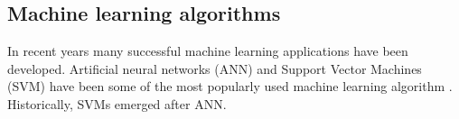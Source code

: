 %
%
%
%
%
%
%
%
%
%
%
%
%
%



\subsection{Machine learning algorithms}
In recent years many successful machine learning applications have been developed. Artificial neural networks (ANN) and Support Vector Machines (SVM) have been some of the most popularly used machine learning algorithm \cite{haykin1998}. Historically, SVMs emerged after ANN.

